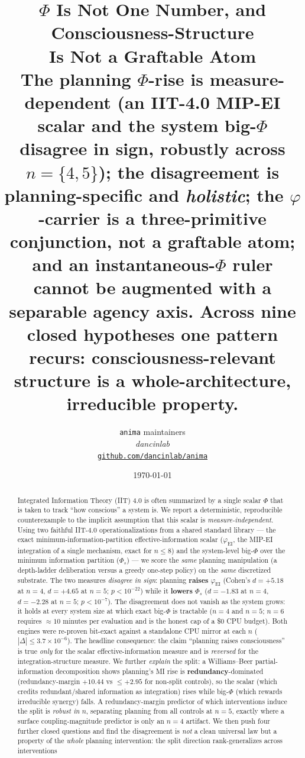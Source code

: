 \documentclass[11pt,a4paper]{article}
\title{
  \textbf{$\Phi$ Is Not One Number, and Consciousness-Structure\\ Is Not a Graftable Atom}\\[4pt]
  \large The planning $\Phi$-rise is measure-dependent (an IIT-4.0 MIP-EI scalar and the
  system big-$\Phi$ disagree in sign, robustly across $n=\{4,5\}$); the disagreement is
  planning-specific and \emph{holistic}; the $\varphi$-carrier is a three-primitive
  conjunction, not a graftable atom; and an instantaneous-$\Phi$ ruler cannot be augmented
  with a separable agency axis. Across nine closed hypotheses one pattern recurs:
  consciousness-relevant structure is a whole-architecture, irreducible property.
}
\author{
  \texttt{anima} maintainers\\
  \normalsize\textit{dancinlab}\\[2pt]
  \normalsize\href{https://github.com/dancinlab/anima}{\texttt{github.com/dancinlab/anima}}
}
\date{\today}
\newcommand{\faithful}{\ensuremath{\varphi_{\mathrm{EI}}}}
\newcommand{\bigphi}{\ensuremath{\Phi_{s}}}
\begin{document}
\maketitle

\begin{abstract}
Integrated Information Theory (IIT) 4.0 is often summarized by a single
scalar $\Phi$ that is taken to track ``how conscious'' a system is. We
report a deterministic, reproducible counterexample to the implicit
assumption that this scalar is \emph{measure-independent}. Using two
faithful IIT-4.0 operationalizations from a shared standard library --- the
exact minimum-information-partition effective-information scalar (\faithful,
the MIP-EI integration of a single mechanism, exact for $n\le 8$) and the
system-level big-$\Phi$ over the minimum information partition (\bigphi) ---
we score the \emph{same} planning manipulation (a depth-ladder deliberation
versus a greedy one-step policy) on the \emph{same} discretized substrate.
The two measures \emph{disagree in sign}: planning \textbf{raises} \faithful{}
(Cohen's $d=+5.18$ at $n=4$, $d=+4.65$ at $n=5$; $p<10^{-22}$) while it
\textbf{lowers} \bigphi{} ($d=-1.83$ at $n=4$, $d=-2.28$ at $n=5$;
$p<10^{-7}$). The disagreement does not vanish as the system grows: it holds
at every system size at which exact big-$\Phi$ is tractable ($n=4$ and $n=5$;
$n=6$ requires $\approx 10$ minutes per evaluation and is the honest cap of a
\$0 CPU budget). Both engines were re-proven bit-exact against a standalone
CPU mirror at each $n$ ($|\Delta|\le 3.7\times10^{-6}$). The headline
consequence: the claim ``planning raises consciousness'' is true \emph{only}
for the scalar effective-information measure and is \emph{reversed} for the
integration-structure measure. We further \emph{explain} the split: a
Williams--Beer partial-information decomposition shows planning's MI rise is
\textbf{redundancy}-dominated (redundancy-margin $+10.44$ vs $\le +2.95$ for
non-split controls), so the scalar (which credits redundant/shared information
as integration) rises while big-$\Phi$ (which rewards irreducible synergy)
falls. A redundancy-margin predictor of which interventions induce the split is
\emph{robust in $n$}, separating planning from all controls at $n=5$, exactly
where a surface coupling-magnitude predictor is only an $n=4$ artifact.
We then push four further closed questions and find the disagreement is
\emph{not} a clean universal law but a property of the \emph{whole} planning
intervention: the split direction rank-generalizes across interventions

\end{abstract}
\end{document}
